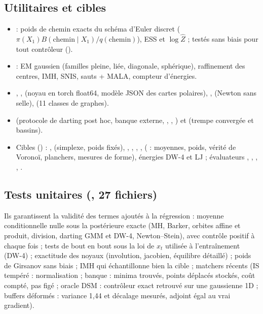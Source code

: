 \subsection{Utilitaires et cibles}
\begin{itemize}
  \item {} : poids de chemin exacts du schéma d'Euler discret ($\pi(X_1)B(\text{chemin}\mid X_1)/q(\text{chemin})$), ESS et $\log\hat Z$ ; testés sans biais pour tout contrôleur ().
  \item {} : EM gaussien (familles pleine, liée, diagonale, sphérique), raffinement des centres, IMH, SNIS, sauts + MALA, compteur d'énergies.
  \item {}, ,  (noyau en torch float64, modèle JSON des cartes polaires), ,  (Newton sans selle),  (11 classes de graphes).
  \item {} (protocole de darting post hoc, banque externe, , , ) et  (trempe convergée et bassins).
  \item Cibles () : ,  (simplexe, poids fixés), , , , ,  ( : moyennes, poids, vérité de Voronoï, planchers, mesures de forme), énergies DW-4 et LJ ; évaluateurs , , , , .
\end{itemize}

\subsection{Tests unitaires (, 27 fichiers)}
Ils garantissent la validité des termes ajoutés à la régression : moyenne conditionnelle nulle sous la postérieure exacte (MH, Barker, orbites affine et produit, division, darting GMM et DW-4, Newton--Stein), avec contrôle positif à chaque fois ; tests de bout en bout sous la loi de $x_t$ utilisée à l'entraînement (DW-4) ; exactitude des noyaux (involution, jacobien, équilibre détaillé) ; poids de Girsanov sans biais ; IMH qui échantillonne bien la cible ; matchers récents (IS tempéré : normalisation ; banque : minima trouvés, points déplacés stockés, coût compté, pas figé ; oracle DSM : contrôleur exact retrouvé sur une gaussienne 1D ; buffers déformés : variance 1,44 et décalage mesurés, adjoint égal au vrai gradient).

